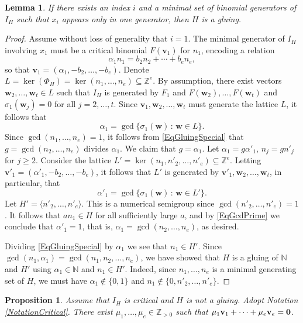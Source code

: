 \documentclass[11pt,twoside]{amsart}
\newcommand{\Z}{\mathbb Z}
\newcommand{\N}{\mathbb N}
\def\bv{{\mathbf v}}
\def\bw{{\mathbf w}}
\newtheorem{prop}[Theorem]{Proposition}
\newtheorem{lem}[Theorem]{Lemma}
\theoremstyle{definition}
\numberwithin{equation}{section}
\begin{document}
\begin{lem}\label{LemmaGluing}
If there exists an index $i$ and a minimal set of binomial generators of $I_H$ such that $x_i$ appears only in one  generator,
then $H$ is a gluing.
\end{lem}
\begin{proof}
Assume without loss of generality that $i=1$.
The minimal generator of $I_H$ involving $x_1$ must be a critical binomial $ F (\bv_1)$ for $n_1$, encoding a relation
\begin{equation}\label{EqGluingSpecial}
\alpha_1 n_1 = b_2 n_2 + \cdots + b_e n_e,
\end{equation}
so that $\bv_1 = (\alpha_1, -b_2, \ldots, -b_e)$.
Denote $L = \ker(\Phi_H) = \ker(n_1, \ldots, n_e)\subseteq \Z^e$.
By assumption, there exist vectors $\bw_2, \ldots, \bw_t \in L$ 
such that $I_H$ is generated by $F_1$ and $F(\bw_2), \ldots, F(\bw_t)$ and $\sigma_1(\bw_j) = 0$ for all $j = 2,\ldots, t$.
Since $\bv_1,\bw_2, \ldots, \bw_t $ must generate the lattice $L$,
it follows that 
$$
\alpha_1 = \gcd\big\{\sigma_1(\bw)\,:\, \bw \in L\big\}.
$$
Since $\gcd(n_1, \ldots, n_e) = 1$, 
it follows from \eqref{EqGluingSpecial} that 
 $g = \gcd(n_2, \ldots, n_e)$ divides $\alpha_1$.
We claim that $g = \alpha_1$.
Let $\alpha_1 = g \alpha'_1$, $n_j = gn'_j$ for $j \geq 2$.
Consider the lattice 
$L' = \ker(n_1, n'_2, \ldots, n'_e)\subseteq \Z^e$.
Letting $\bv'_1 = (\alpha'_1,-b_2, \ldots, -b_e)$,
it follows  that $L'$ is generated by 
$\bv'_1,\bw_2, \ldots, \bw_t $,
in particular,  that
\begin{equation}\label{EqGcdPrime}
\alpha'_1 = \gcd\big\{\sigma_1(\bw)\,:\, \bw \in L'\big\}.
\end{equation}
Let $H' = \langle n'_2, \ldots, n'_e \rangle$.
This is a numerical semigroup since
 $\gcd(n'_2, \ldots, n'_e) =1$.
 It follows that $an_1 \in H $ for all sufficiently large $a$, and by \eqref{EqGcdPrime} we conclude that $\alpha'_1=1$, that is, $\alpha_1= \gcd(n_2, \ldots, n_e)$, as desired.

Dividing \eqref{EqGluingSpecial} by $\alpha_1$ we see  that $n_1 \in H'$.
Since $\gcd(n_1, \alpha_1) = \gcd(n_1, n_2,\ldots, n_e)$,
we have showed that  $H$ is a gluing of $\N$ and $H'$ using $\alpha_1 \in \N$
and $n_1 \in H'$.
Indeed, since $n_1, \ldots, n_e$ is a minimal generating set of $H$,
we must have
$\alpha_1 \notin\{0,1\}$ and $n_1 \notin \{0,n'_2, \ldots, n'_e\}$.
\end{proof}



\begin{prop}\label{PropMinimalRelationVi}
Assume that $I_H$ is critical and  $H$ is not a gluing. 
Adopt Notation \ref{NotationCritical}.
There exist   $\mu_1,\ldots,\mu_e \in \Z_{>0}$ such that  
$\mu_1{\bf v}_1+\cdots + \mu_e{\bf v}_e = {\bf 0}$.
\end{prop}
\end{document}
